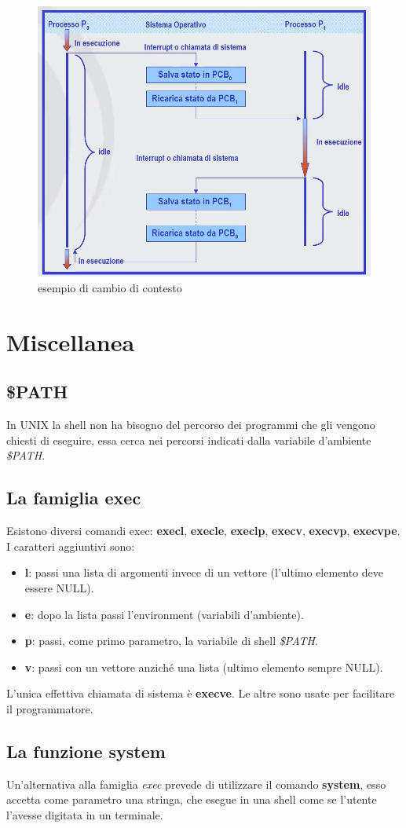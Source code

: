   \begin{figure}
    \centering
    \includegraphics[width=1\linewidth]{assets/switch3.png}
    \caption{esempio di cambio di contesto}
    \label{switch3}
  \end{figure}

  \section{Miscellanea}
  \subsection{\$PATH}
  In UNIX la shell non ha bisogno del percorso dei programmi che gli vengono chiesti di eseguire, essa cerca nei percorsi indicati dalla variabile d'ambiente \textit{\$PATH}.

  \subsection{La famiglia exec}

  Esistono diversi comandi exec: \textbf{execl}, \textbf{execle}, \textbf{execlp}, \textbf{execv}, \textbf{execvp}, \textbf{execvpe}. I caratteri aggiuntivi sono: 
  \begin{itemize}
    \item \textbf{l}: passi una lista di argomenti invece di un vettore (l'ultimo elemento deve essere NULL).
    \item \textbf{e}: dopo la lista passi l'environment (variabili d'ambiente).
    \item \textbf{p}: passi, come primo parametro, la variabile di shell \textit{\$PATH}.
    \item \textbf{v}: passi con un vettore anziché una lista (ultimo elemento sempre NULL).
  \end{itemize}
L'unica effettiva chiamata di sistema è \textbf{execve}. Le altre sono usate per facilitare il programmatore.

\subsection{La funzione system}
Un'alternativa alla famiglia \textit{exec} prevede di utilizzare il comando \textbf{system}, esso accetta come parametro una stringa, che esegue in una shell come se l'utente l'avesse digitata in un terminale.